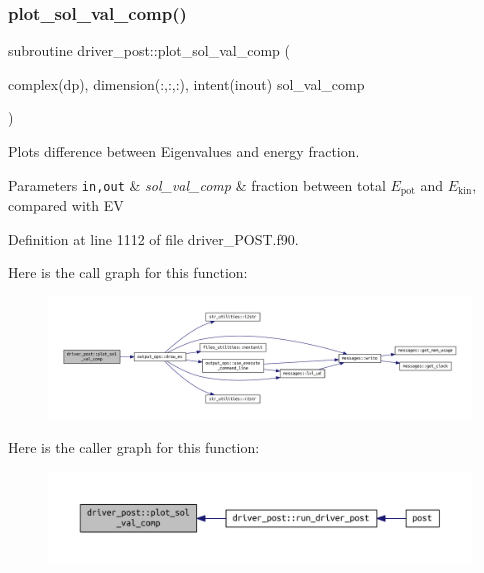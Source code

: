 \subsubsection{\texorpdfstring{plot\+\_\+sol\+\_\+val\+\_\+comp()}{plot\_sol\_val\_comp()}}
{\footnotesize\ttfamily subroutine driver\+\_\+post\+::plot\+\_\+sol\+\_\+val\+\_\+comp (\begin{DoxyParamCaption}\item[{complex(dp), dimension(\+:,\+:,\+:), intent(inout)}]{sol\+\_\+val\+\_\+comp }\end{DoxyParamCaption})}



Plots difference between Eigenvalues and energy fraction. 


\begin{DoxyParams}[1]{Parameters}
\mbox{\tt in,out}  & {\em sol\+\_\+val\+\_\+comp} & fraction between total $E_{\text{pot}}$ and $E_{\text{kin}}$, compared with EV \\
\hline
\end{DoxyParams}


Definition at line 1112 of file driver\+\_\+\+P\+O\+S\+T.\+f90.

Here is the call graph for this function\+:\nopagebreak
\begin{figure}[H]
\begin{center}
\leavevmode
\includegraphics[width=350pt]{namespacedriver__post_af9ce961d2d6825b767a93fdbe8806a1c_cgraph}
\end{center}
\end{figure}
Here is the caller graph for this function\+:\nopagebreak
\begin{figure}[H]
\begin{center}
\leavevmode
\includegraphics[width=350pt]{namespacedriver__post_af9ce961d2d6825b767a93fdbe8806a1c_icgraph}
\end{center}
\end{figure}
\mbox{\label{namespacedriver__post_a33b3c6f9018a0ddc92dce77394b8ab37}} 
